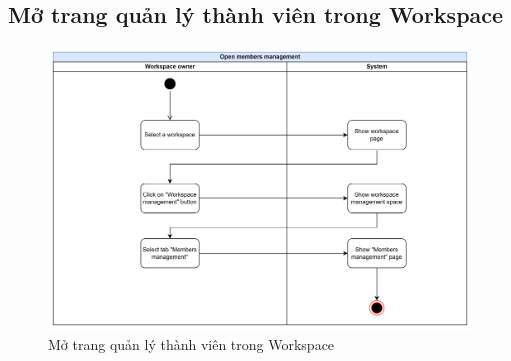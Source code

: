 \subsection{Mở trang quản lý thành viên trong Workspace}
    \begin{figure}[H]
        \centering
        \includegraphics[width=\linewidth]{Content/Phân tích và thiết kế hệ thống/documents/Sơ đồ hoạt động/images/openMemberManagement.png}
        \vspace{0.5cm}
        \caption{Mở trang quản lý thành viên trong Workspace}
        \label{fig:Mở trang quản lý thành viên trong Workspace}
    \end{figure}